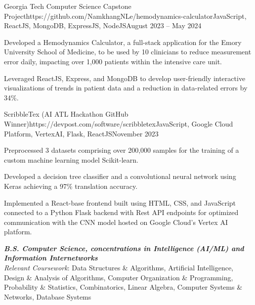 \documentclass{article}
\begin{document}
\begin{flushleft}
    \begin{project}{Georgia Tech Computer Science Capstone Project}{https://github.com/NamkhangNLe/hemodynamics-calculator}{JavaScript, ReactJS, MongoDB, ExpressJS, NodeJS}{August 2023 -- May 2024}
        \item Developed a Hemodynamics Calculator, a full-stack application for the Emory University School of Medicine, to be used by 10 clinicians to reduce measurement error daily, impacting over 1,000 patients within the intensive care unit.
        \item Leveraged ReactJS, Express, and MongoDB to develop user-friendly interactive visualizations of trends in patient data and a reduction in data-related errors by 34\%.
    \end{project}

    \begin{project}{ScribbleTex (AI ATL Hackathon GitHub Winner)}{https://devpost.com/software/scribbletex}{JavaScript, Google Cloud Platform, VertexAI, Flask, ReactJS}{November 2023}
        \item Preprocessed 3 datasets comprising over 200,000 samples for the training of a custom machine learning model Scikit-learn.
        \item Developed a decision tree classifier and a convolutional neural network using Keras achieving a 97\% translation accuracy.
        \item Implemented a React-base frontend built using HTML, CSS, and JavaScript connected to a Python Flask backend with Rest API endpoints for optimized communication with the CNN model hosted on Google Cloud's Vertex AI platform.
    \end{project}


 {}
{\textbf{\textit{B.S. Computer Science, concentrations in Intelligence (AI/ML) and Information Internetworks}}  \\ \textit{Relevant Coursework}: Data Structures \& Algorithms, Artificial Intelligence, Design \& Analysis of Algorithms, Computer Organization \& Programming, Probability \& Statistics, Combinatorics, Linear Algebra, Computer Systems \& Networks, Database Systems }


    \vspace{3pt}
     \\
     \\
    \\
     \\
    

\end{flushleft}
\end{document}
